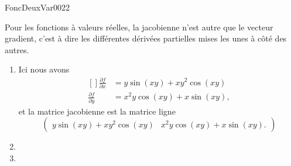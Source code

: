 
\begin{corrige}{FoncDeuxVar0022}

	Pour les fonctions à valeurs réelles, la jacobienne n'est autre que le vecteur gradient, c'est à dire les différentes dérivées partielles mises les unes à côté des autres.
	\begin{enumerate}

		\item
			Ici nous avons
			\begin{equation}
				\begin{aligned}[]
					\frac{ \partial f }{ \partial x }&=y\sin(xy)+xy^2\cos(xy)\\
					\frac{ \partial f }{ \partial y }&=x^2y\cos(xy)+x\sin(xy),
				\end{aligned}
			\end{equation}
			et la matrice jacobienne est la matrice ligne 
			\begin{equation}
				\begin{pmatrix} 
					y\sin(xy)+xy^2\cos(xy)	&	x^2y\cos(xy)+x\sin(xy).	
				\end{pmatrix}
			\end{equation}
		\item
		\item

	\end{enumerate}
	

\end{corrige}
